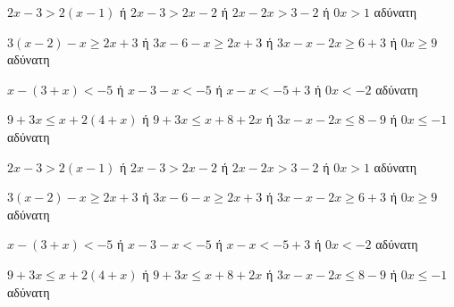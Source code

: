 \begin{alist}
\item $ 2x-3>2(x-1) $ ή $ 2x-3>2x-2 $ ή $ 2x-2x>3-2 $ ή $ 0x>1 $ αδύνατη
\item $ 3(x-2)-x\geq 2x+3 $ ή $ 3x-6-x\geq 2x+3 $ ή $ 3x-x-2x\geq 6+3 $ ή $ 0x\geq 9 $ αδύνατη
\item $ x-(3+x)<-5 $ ή $ x-3-x<-5 $ ή $ x-x<-5+3 $ ή $ 0x<-2 $ αδύνατη
\item $ 9+3x\leq x+2(4+x) $ ή $ 9+3x\leq x+8+2x $ ή $ 3x-x-2x\leq 8-9 $ ή $ 0x\leq -1 $ αδύνατη
\end{alist}
\begin{alist}
\item $ 2x-3>2(x-1) $ ή $ 2x-3>2x-2 $ ή $ 2x-2x>3-2 $ ή $ 0x>1 $ αδύνατη
\item $ 3(x-2)-x\geq 2x+3 $ ή $ 3x-6-x\geq 2x+3 $ ή $ 3x-x-2x\geq 6+3 $ ή $ 0x\geq 9 $ αδύνατη
\item $ x-(3+x)<-5 $ ή $ x-3-x<-5 $ ή $ x-x<-5+3 $ ή $ 0x<-2 $ αδύνατη
\item $ 9+3x\leq x+2(4+x) $ ή $ 9+3x\leq x+8+2x $ ή $ 3x-x-2x\leq 8-9 $ ή $ 0x\leq -1 $ αδύνατη
\end{alist}
